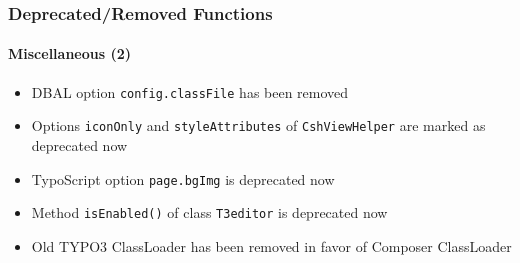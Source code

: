 \begin{frame}[fragile]
	\frametitle{Deprecated/Removed Functions}
	\framesubtitle{Miscellaneous (2)}

	\begin{itemize}

		\item DBAL option \texttt{config.classFile} has been removed

		\item Options \texttt{iconOnly} and \texttt{styleAttributes} of
			\texttt{CshViewHelper} are marked as deprecated now

		\item TypoScript option \texttt{page.bgImg} is deprecated now

		\item Method \texttt{isEnabled()} of class \texttt{T3editor} is deprecated now

		\item Old TYPO3 ClassLoader has been removed in favor of Composer ClassLoader

	\end{itemize}

\end{frame}

